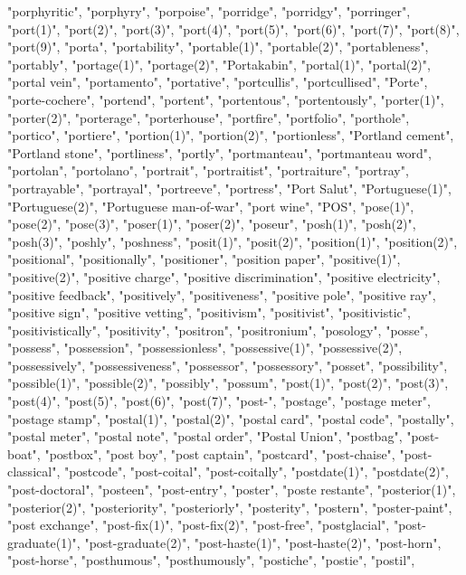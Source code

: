 "porphyritic",
"porphyry",
"porpoise",
"porridge",
"porridgy",
"porringer",
"port(1)",
"port(2)",
"port(3)",
"port(4)",
"port(5)",
"port(6)",
"port(7)",
"port(8)",
"port(9)",
"porta",
"portability",
"portable(1)",
"portable(2)",
"portableness",
"portably",
"portage(1)",
"portage(2)",
"Portakabin",
"portal(1)",
"portal(2)",
"portal vein",
"portamento",
"portative",
"portcullis",
"portcullised",
"Porte",
"porte-cochere",
"portend",
"portent",
"portentous",
"portentously",
"porter(1)",
"porter(2)",
"porterage",
"porterhouse",
"portfire",
"portfolio",
"porthole",
"portico",
"portiere",
"portion(1)",
"portion(2)",
"portionless",
"Portland cement",
"Portland stone",
"portliness",
"portly",
"portmanteau",
"portmanteau word",
"portolan",
"portolano",
"portrait",
"portraitist",
"portraiture",
"portray",
"portrayable",
"portrayal",
"portreeve",
"portress",
"Port Salut",
"Portuguese(1)",
"Portuguese(2)",
"Portuguese man-of-war",
"port wine",
"POS",
"pose(1)",
"pose(2)",
"pose(3)",
"poser(1)",
"poser(2)",
"poseur",
"posh(1)",
"posh(2)",
"posh(3)",
"poshly",
"poshness",
"posit(1)",
"posit(2)",
"position(1)",
"position(2)",
"positional",
"positionally",
"positioner",
"position paper",
"positive(1)",
"positive(2)",
"positive charge",
"positive discrimination",
"positive electricity",
"positive feedback",
"positively",
"positiveness",
"positive pole",
"positive ray",
"positive sign",
"positive vetting",
"positivism",
"positivist",
"positivistic",
"positivistically",
"positivity",
"positron",
"positronium",
"posology",
"posse",
"possess",
"possession",
"possessionless",
"possessive(1)",
"possessive(2)",
"possessively",
"possessiveness",
"possessor",
"possessory",
"posset",
"possibility",
"possible(1)",
"possible(2)",
"possibly",
"possum",
"post(1)",
"post(2)",
"post(3)",
"post(4)",
"post(5)",
"post(6)",
"post(7)",
"post-",
"postage",
"postage meter",
"postage stamp",
"postal(1)",
"postal(2)",
"postal card",
"postal code",
"postally",
"postal meter",
"postal note",
"postal order",
"Postal Union",
"postbag",
"post-boat",
"postbox",
"post boy",
"post captain",
"postcard",
"post-chaise",
"post-classical",
"postcode",
"post-coital",
"post-coitally",
"postdate(1)",
"postdate(2)",
"post-doctoral",
"posteen",
"post-entry",
"poster",
"poste restante",
"posterior(1)",
"posterior(2)",
"posteriority",
"posteriorly",
"posterity",
"postern",
"poster-paint",
"post exchange",
"post-fix(1)",
"post-fix(2)",
"post-free",
"postglacial",
"post-graduate(1)",
"post-graduate(2)",
"post-haste(1)",
"post-haste(2)",
"post-horn",
"post-horse",
"posthumous",
"posthumously",
"postiche",
"postie",
"postil",
